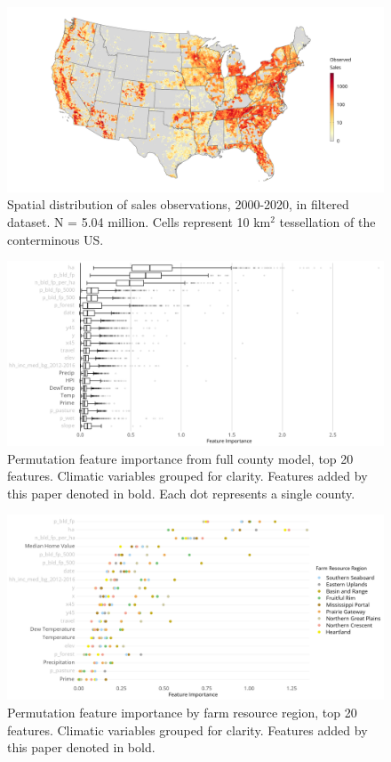 \documentclass[12pt]{article}
\begin{document}
\begin{figure}[H]
    \centering
    \includegraphics[width=1\textwidth]{exhibits/clean_obs_density.png}
    \caption{Spatial distribution of sales observations, 2000-2020, in filtered dataset. N = 5.04 million. Cells represent 10 km$^2$ tessellation of the conterminous US.}
    \label{fig:clean_obs_density}
\end{figure}

\begin{figure}[H]
    \centering
    \includegraphics[width=1\textwidth]{exhibits/fcb_importance_t20.png}
    \caption{Permutation feature importance from full county model, top 20 features. Climatic variables grouped for clarity. Features added by this paper denoted in bold. Each dot represents a single county.}
    \label{fig:fcb_importance}
\end{figure}

\begin{figure}[H]
    \centering
    \includegraphics[width=1\textwidth]{exhibits/ffb_importance_t20.png}
    \caption{Permutation feature importance by farm resource region, top 20 features. Climatic variables grouped for clarity. Features added by this paper denoted in bold.}
    \label{fig:ffb_importance}
\end{figure}
\end{document}
